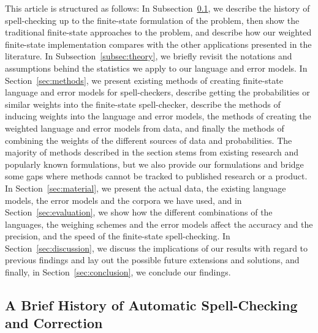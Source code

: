 \documentclass[a4paper,12pt]{article}
\begin{document}
This article is structured as follows: In Subsection~\ref{subsec:background}, we describe the history of spell-checking up
to the finite-state formulation of the problem, then show the traditional
finite-state approaches to the problem, and describe how our weighted
finite-state implementation compares with the other applications presented in
the literature. In Subsection~\ref{subsec:theory}, we briefly revisit the
notations and assumptions behind the statistics we apply to our language and
error models. In Section~\ref{sec:methods}, we present existing methods of
creating finite-state language and error models for spell-checkers,
describe getting the probabilities or similar weights into the finite-state
spell-checker, describe the methods of inducing weights into the language and
error models, the methods of creating the weighted language and error models
from data, and finally the methods of combining the weights of the different
sources of data and probabilities. The majority of methods described in the
section stems from existing research and popularly known formulations, but we
also provide our formulations and bridge some gaps where methods cannot be
tracked to published research or a product. In Section~\ref{sec:material}, we
present the actual data, the existing language models, the error models and the
corpora we have used, and in Section~\ref{sec:evaluation}, we show how the
different combinations of the languages, the weighing schemes and the error
models affect the accuracy and the precision, and the speed of the finite-state
spell-checking. In Section~\ref{sec:discussion}, we discuss the implications of our
results with regard to previous findings and lay out the possible future
extensions and solutions, and finally, in Section~\ref{sec:conclusion}, we
conclude our findings.

\subsection{A Brief History of Automatic Spell-Checking and Correction}
\label{subsec:background}
\end{document}
